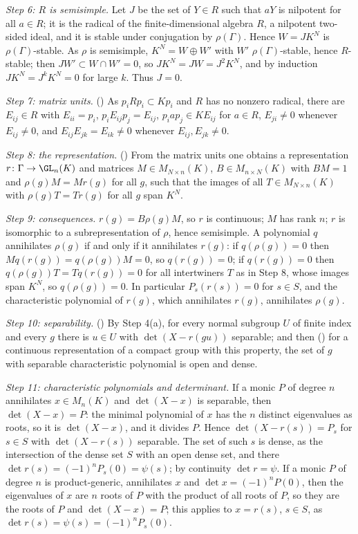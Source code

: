 \emph{Step 6: $R$ is semisimple.} Let $J$ be the set of $Y\in R$ such that $aY$ is nilpotent for all $a\in R$; it is the
radical of the finite-dimensional algebra $R$, a nilpotent two-sided ideal, and it is stable under conjugation by
$\rho(\Gamma)$. Hence $W=JK^N$ is $\rho(\Gamma)$-stable. As $\rho$ is semisimple, $K^N=W\oplus W'$ with $W'$
$\rho(\Gamma)$-stable, hence $R$-stable; then $JW'\subset W\cap W'=0$, so $JK^N=JW=J^2K^N$, and by induction
$JK^N=J^kK^N=0$ for large $k$. Thus $J=0$.

\emph{Step 7: matrix units.} () As $p_iRp_i\subset
Kp_i$ and $R$ has no nonzero radical, there are $E_{ij}\in R$ with $E_{ii}=p_i$, $p_iE_{ij}p_j=E_{ij}$, $p_iap_j\in KE_{ij}$
for $a\in R$, $E_{ji}\ne0$ whenever $E_{ij}\ne0$, and $E_{ij}E_{jk}=E_{ik}\ne0$ whenever $E_{ij},E_{jk}\ne0$.

\emph{Step 8: the representation.} () From the matrix units
one obtains a representation $r\colon\Gamma\to\GL_n(K)$ and matrices $M\in M_{N\times n}(K)$, $B\in M_{n\times N}(K)$ with
$BM=1$ and $\rho(g)M=Mr(g)$ for all $g$, such that the images of all $T\in M_{N\times n}(K)$ with $\rho(g)T=Tr(g)$ for all
$g$ span $K^N$.

\emph{Step 9: consequences.} $r(g)=B\rho(g)M$, so $r$ is continuous; $M$ has rank $n$; $r$ is isomorphic to a
subrepresentation of $\rho$, hence semisimple. A polynomial $q$ annihilates $\rho(g)$ if and only if it annihilates
$r(g)$: if $q(\rho(g))=0$ then $Mq(r(g))=q(\rho(g))M=0$, so $q(r(g))=0$; if $q(r(g))=0$ then $q(\rho(g))T=Tq(r(g))=0$ for
all intertwiners $T$ as in Step 8, whose images span $K^N$, so $q(\rho(g))=0$. In particular $P_s(r(s))=0$ for $s\in S$, and
the characteristic polynomial of $r(g)$, which annihilates $r(g)$, annihilates $\rho(g)$.

\emph{Step 10: separability.} () By Step 4(a), for
every normal subgroup $U$ of finite index and every $g$ there is $u\in U$ with $\det(X-r(gu))$ separable; and then
() for a continuous representation of a compact group
with this property, the set of $g$ with separable characteristic polynomial is open and dense.

\emph{Step 11: characteristic polynomials and determinant.} If a monic $P$ of degree $n$ annihilates $x\in M_n(K)$ and
$\det(X-x)$ is separable, then $\det(X-x)=P$: the minimal polynomial of $x$ has the $n$ distinct eigenvalues as roots, so
it is $\det(X-x)$, and it divides $P$. Hence $\det(X-r(s))=P_s$ for $s\in S$ with $\det(X-r(s))$ separable. The set of
such $s$ is dense, as the intersection of the dense set $S$ with an open dense set, and there $\det r(s)=(-1)^nP_s(0)=
\psi(s)$; by continuity $\det r=\psi$. If a monic $P$ of degree $n$ is product-generic, annihilates $x$ and
$\det x=(-1)^nP(0)$, then the eigenvalues of $x$ are $n$ roots of $P$ with the product of all roots of $P$, so they are the
roots of $P$ and $\det(X-x)=P$; this applies to $x=r(s)$, $s\in S$, as $\det r(s)=\psi(s)=(-1)^nP_s(0)$.

